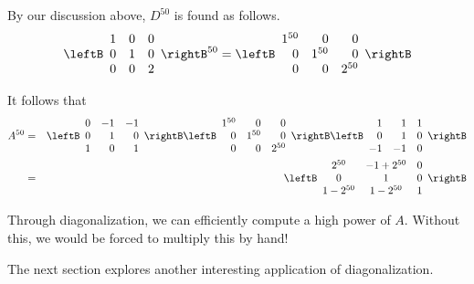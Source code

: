 \begin{solution}
By our discussion above, $D^{50}$ is found as follows.
\begin{equation*}
\leftB
\begin{array}{rrr}
1 & 0 & 0 \\
0 & 1 & 0 \\
0 & 0 & 2
\end{array}
\rightB ^{50}=\leftB
\begin{array}{rrr}
1^{50} & 0      & 0 \\
0      & 1^{50} & 0 \\
0      & 0      & 2^{50}
\end{array}
\rightB 
\end{equation*}

It follows that
\begin{eqnarray*}
A^{50} &=&\leftB
\begin{array}{rrr}
0 & -1 & -1 \\
0 & 1 & 0 \\
1 & 0 & 1
\end{array}
\rightB \leftB
\begin{array}{rrr}
1^{50} & 0      & 0 \\
0      & 1^{50} & 0 \\
0      & 0      & 2^{50}
\end{array}
\rightB \leftB
\begin{array}{rrr}
1 & 1 & 1 \\
0 & 1 & 0 \\
-1 & -1 & 0
\end{array}
\rightB \\
&=&\leftB
\begin{array}{ccc}
2^{50} & -1+2^{50} & 0 \\
0 & 1 & 0 \\
1-2^{50} & 1-2^{50} & 1
\end{array}
\rightB 
\end{eqnarray*}

\end{solution}

Through diagonalization, we can efficiently compute a high power of $A$. Without this, we would be forced to multiply this by hand! 

The next section explores another interesting application of diagonalization. 